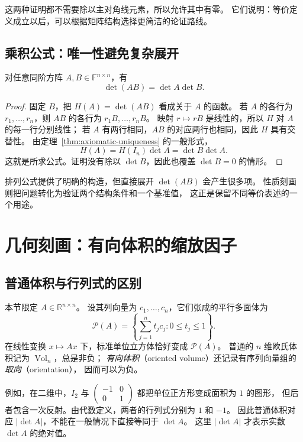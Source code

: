 \documentclass[UTF8,12pt,a4paper,fontset=fandol]{ctexart}
\begin{document}
这两种证明都不需要除以主对角线元素，所以允许其中有零。
它们说明：等价定义成立以后，可以根据矩阵结构选择更简洁的论证路线。

\subsection{乘积公式：唯一性避免复杂展开}

\begin{theorem}[行列式的乘积公式]
\label{thm:multiplicativity}
对任意同阶方阵 $A,B\in\mathbb F^{n\times n}$，有
\begin{equation}
  \det(AB)=\det A\det B.
  \label{eq:multiplicativity}
\end{equation}
\end{theorem}

\begin{proof}
固定 $B$，把 $H(A)=\det(AB)$ 看成关于 $A$ 的函数。
若 $A$ 的各行为 $r_1,\ldots,r_n$，则 $AB$ 的各行为 $r_1B,\ldots,r_nB$。
映射 $r\mapsto rB$ 是线性的，所以 $H$ 对 $A$ 的每一行分别线性；
若 $A$ 有两行相同，$AB$ 的对应两行也相同，因此 $H$ 具有交替性。
由定理~\ref{thm:axiomatic-uniqueness} 的一般形式，
\[
  H(A)=H(I_n)\det A=\det B\det A.
\]
这就是所求公式。证明没有除以 $\det B$，因此也覆盖 $\det B=0$ 的情形。
\end{proof}

排列公式提供了明确的构造，但直接展开 $\det(AB)$ 会产生很多项。
性质刻画则把问题转化为验证两个结构条件和一个基准值，
这正是保留不同等价表述的一个用途。

\section{几何刻画：有向体积的缩放因子}
\label{sec:geometry}

\subsection{普通体积与行列式的区别}

本节限定 $A\in\mathbb R^{n\times n}$。
设其列向量为 $c_1,\ldots,c_n$，它们张成的平行多面体为
\[
  \mathcal P(A)
  =\left\{\sum_{j=1}^{n}t_jc_j:0\leq t_j\leq1\right\}.
\]
在线性变换 $x\mapsto Ax$ 下，标准单位立方体恰好变成 $\mathcal P(A)$。
普通的 $n$ 维欧氏体积记为 $\operatorname{Vol}_n$，总是非负；
\emph{有向体积}（oriented volume）还记录有序列向量组的\emph{取向}（orientation），
因而可以为负。

例如，在二维中，$I_2$ 与 $\begin{pmatrix}-1&0\\0&1\end{pmatrix}$
都把单位正方形变成面积为 $1$ 的图形，
但后者包含一次反射。由代数定义，两者的行列式分别为 $1$ 和 $-1$。
因此普通体积对应 $|\det A|$，不能在一般情况下直接等同于 $\det A$。
这里 $|\det A|$ 才表示实数 $\det A$ 的绝对值。
\end{document}
